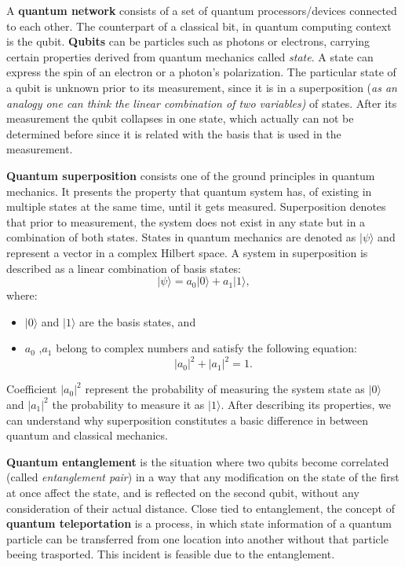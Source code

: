 \documentclass[12pt]{ieeetj}
\begin{document}
		A \textbf{quantum network} consists of a set of quantum processors/devices connected to each other.
		The counterpart of a classical bit, in quantum computing context is the qubit.
		\textbf{Qubits} can be particles such as photons
		or electrons, carrying certain properties derived from quantum mechanics called \textit{state}. A state can express the spin of an electron or
		a photon's polarization. The particular state of a qubit is unknown prior to its measurement, since it is in a 
		superposition (\textit{as an analogy one can think the linear combination of two variables)} of states.
		After its measurement the qubit collapses in one state, which actually can not be determined
		before since it is related with the basis that is used in the measurement.
		
		\textbf{Quantum superposition} consists one of the ground principles in quantum mechanics. 
		It presents the property that quantum system has, of existing in multiple states at the same time, until it gets measured. 
		Superposition denotes that prior to measurement, the system does not exist in any state but in a combination of both states.
		States in quantum mechanics are denoted as $|\psi\rangle$ and represent a vector in a complex Hilbert space. 
		A system in superposition is described as a linear combination of basis states:
			\[
			|\psi\rangle = a_0 |0\rangle + a_1 |1\rangle,
			\]
		where:
		\begin{itemize}
			\item $|0\rangle$ and $|1\rangle$ are the basis states, and
			\item $a_0$ ,$a_1$ belong to complex numbers and satisfy the following equation:
			\[
			|a_0|^2 + |a_1|^2 = 1.
			\]
		\end{itemize}

		Coefficient $|a_0|^2$ represent the probability of measuring the system state as $|0\rangle$ and $|a_1|^2$ the probability to measure it
		as $|1\rangle$. After describing its properties, we can understand why superposition constitutes a 
		basic difference in between quantum and classical mechanics. 

		\textbf{Quantum entanglement} is the situation where two qubits become correlated
		(called \textit{entanglement pair}) in a way that
		any modification on the state of the first at once affect the state, and is reflected on the second qubit, 
		without any consideration of their actual distance. 
		Close tied to entanglement, the concept
		of \textbf{quantum teleportation} is a process, in which state information of a quantum particle can be transferred
		from one location into another without that particle beeing trasported.
		This incident is feasible due to the entanglement.
		
\end{document}
